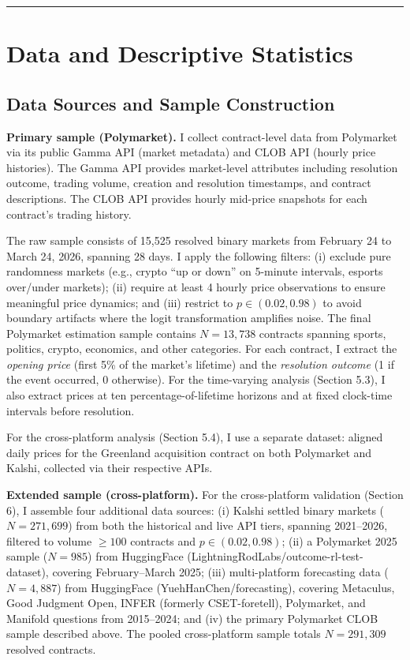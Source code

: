 \documentclass[12pt,a4paper]{article}
\begin{document}
\begin{center}\rule{0.5\linewidth}{0.5pt}\end{center}

\section{Data and Descriptive
Statistics}\label{data-and-descriptive-statistics}

\subsection{Data Sources and Sample
Construction}\label{data-sources-and-sample-construction}

\textbf{Primary sample (Polymarket).} I collect contract-level data from
Polymarket via its public Gamma API (market metadata) and CLOB API
(hourly price histories). The Gamma API provides market-level attributes
including resolution outcome, trading volume, creation and resolution
timestamps, and contract descriptions. The CLOB API provides hourly
mid-price snapshots for each contract's trading history.

The raw sample consists of 15,525 resolved binary markets from February
24 to March 24, 2026, spanning 28 days. I apply the following filters:
(i) exclude pure randomness markets (e.g., crypto ``up or down'' on
5-minute intervals, esports over/under markets); (ii) require at least 4
hourly price observations to ensure meaningful price dynamics; and (iii)
restrict to \(p \in (0.02, 0.98)\) to avoid boundary artifacts where the
logit transformation amplifies noise. The final Polymarket estimation
sample contains \(N = 13{,}738\) contracts spanning sports, politics,
crypto, economics, and other categories. For each contract, I extract
the \emph{opening price} (first 5\% of the market's lifetime) and the
\emph{resolution outcome} (1 if the event occurred, 0 otherwise). For
the time-varying analysis (Section 5.3), I also extract prices at ten
percentage-of-lifetime horizons and at fixed clock-time intervals before
resolution.

For the cross-platform analysis (Section 5.4), I use a separate dataset:
aligned daily prices for the Greenland acquisition contract on both
Polymarket and Kalshi, collected via their respective APIs.

\textbf{Extended sample (cross-platform).} For the cross-platform
validation (Section 6), I assemble four additional data sources: (i)
Kalshi settled binary markets (\(N = 271{,}699\)) from both the
historical and live API tiers, spanning 2021--2026, filtered to volume
\(\geq 100\) contracts and \(p \in (0.02, 0.98)\); (ii) a Polymarket
2025 sample (\(N = 985\)) from HuggingFace
(LightningRodLabs/outcome-rl-test-dataset), covering February--March
2025; (iii) multi-platform forecasting data (\(N = 4{,}887\)) from
HuggingFace (YuehHanChen/forecasting), covering Metaculus, Good Judgment
Open, INFER (formerly CSET-foretell), Polymarket, and Manifold questions
from 2015--2024; and (iv) the primary Polymarket CLOB sample described
above. The pooled cross-platform sample totals \(N = 291{,}309\)
resolved contracts.
\end{document}
